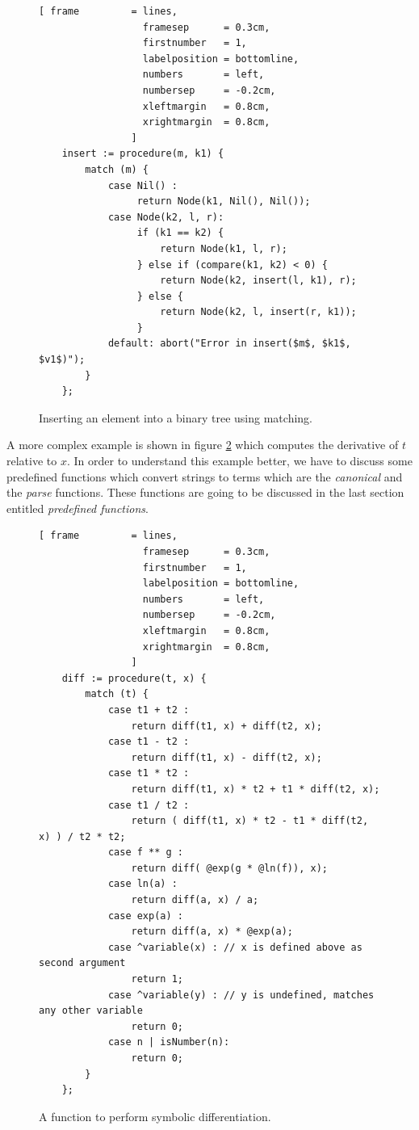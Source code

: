 \documentclass[11pt]{report}
\begin{document}
\begin{figure}[!ht]
\centering
\begin{Verbatim}[ frame         = lines, 
                  framesep      = 0.3cm, 
                  firstnumber   = 1,
                  labelposition = bottomline,
                  numbers       = left,
                  numbersep     = -0.2cm,
                  xleftmargin   = 0.8cm,
                  xrightmargin  = 0.8cm,
                ]
    insert := procedure(m, k1) {
        match (m) {
            case Nil() : 
                 return Node(k1, Nil(), Nil());
            case Node(k2, l, r): 
                 if (k1 == k2) {
                     return Node(k1, l, r);
                 } else if (compare(k1, k2) < 0) { 
                     return Node(k2, insert(l, k1), r);
                 } else {
                     return Node(k2, l, insert(r, k1));
                 }
            default: abort("Error in insert($m$, $k1$, $v1$)");
        }
    };
\end{Verbatim}
\vspace*{-0.3cm}
\caption{Inserting an element into a binary tree using matching.}
\label{fig:binary-tree.stlx}
\end{figure}

A more complex example is shown in figure \ref{fig:diff.stlx} which computes the derivative of $t$ relative to $x$. In order to understand this example better, we have to discuss some predefined functions which convert strings to terms which are the \textsl{canonical} and the \textsl{parse} functions. These functions are going to be discussed in the last section entitled \textsl{predefined functions}.

\begin{figure}[!ht]
\centering
\begin{Verbatim}[ frame         = lines, 
                  framesep      = 0.3cm, 
                  firstnumber   = 1,
                  labelposition = bottomline,
                  numbers       = left,
                  numbersep     = -0.2cm,
                  xleftmargin   = 0.8cm,
                  xrightmargin  = 0.8cm,
                ]
    diff := procedure(t, x) {
        match (t) {
            case t1 + t2 :
                return diff(t1, x) + diff(t2, x);
            case t1 - t2 :
                return diff(t1, x) - diff(t2, x);
            case t1 * t2 :
                return diff(t1, x) * t2 + t1 * diff(t2, x);
            case t1 / t2 :
                return ( diff(t1, x) * t2 - t1 * diff(t2, x) ) / t2 * t2;
            case f ** g :
                return diff( @exp(g * @ln(f)), x);
            case ln(a) :
                return diff(a, x) / a;
            case exp(a) :
                return diff(a, x) * @exp(a);
            case ^variable(x) : // x is defined above as second argument
                return 1;
            case ^variable(y) : // y is undefined, matches any other variable
                return 0;
            case n | isNumber(n):   
                return 0;  
        }
    };
\end{Verbatim}
\vspace*{-0.3cm}
\caption{A function to perform symbolic differentiation.}
\label{fig:diff.stlx}
\end{figure}
\end{document}
